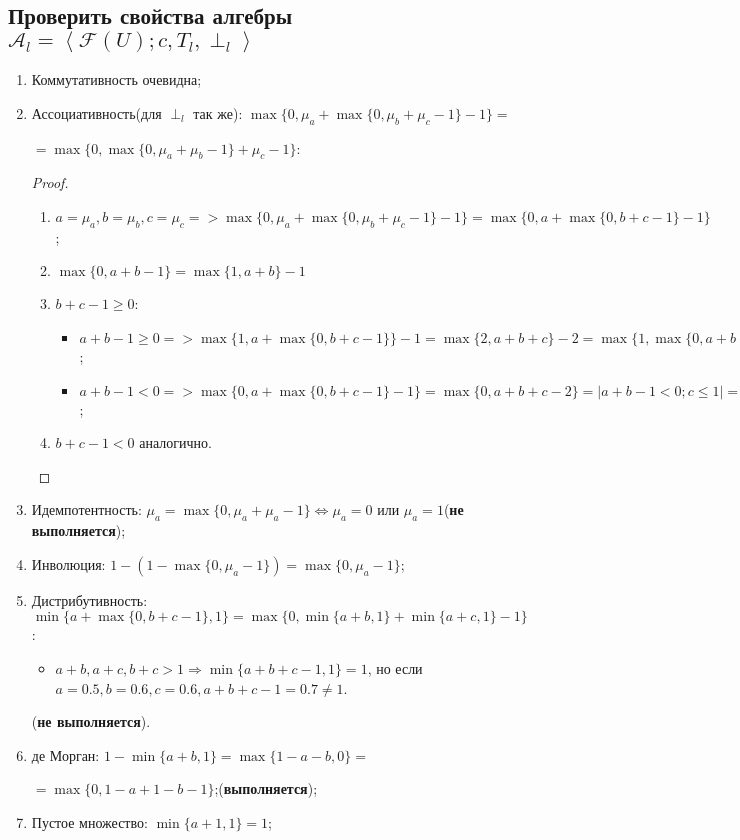 \documentclass[12pt]{article}
\begin{document}
\subsection{Проверить свойства алгебры $\mathcal{A}_l=\left<\mathcal{F}(U); c, T_l, \perp_l\right>$}

\begin{enumerate}
    \item Коммутативность очевидна;
    \item Ассоциативность(для $\perp_l$ так же): $\max\{0, \mu_a+\max\{0, \mu_b+\mu_c-1\}-1\} =$ 
    
    $= \max\{0, \max\{0, \mu_a+\mu_b-1\}+\mu_c-1\}$:
        \begin{proof}
            \begin{enumerate}
                \item $a = \mu_a, b=\mu_b, c=\mu_c => \max\{0, \mu_a+\max\{0, \mu_b+\mu_c-1\}-1\}=\max\{0, a+\max\{0, b+c-1\}-1\}$;
                \item $\max\{0, a+b-1\}=\max\{1, a+b\}-1$
                \item $b+c-1\ge0$:
                    \begin{itemize}
                        \item $a+b-1\ge0 => \max\{1, a+\max\{0, b+c-1\}\}-1=\max\{2, a+b+c\}-2=\max\{1, \max\{0, a+b-1\}+c\}-1$;
                        \item $a+b-1<0 =>  \max\{0, a+\max\{0, b+c-1\}-1\}=\max\{0, a+b+c-2\}=|a+b-1<0; c\le1|=0=\max\{0, c-1\}=\max\{0, \max\{0, a+b-1\}+c-1\}$;
                    \end{itemize}
                \item $b+c-1<0$ аналогично.
            \end{enumerate}
        \end{proof}
    \item Идемпотентность: $\mu_a=\max\{0, \mu_a+\mu_a-1\} \Leftrightarrow \mu_a = 0 \text{ или } \mu_a = 1$(\textbf{не выполняется});
    \item Инволюция: $1-(1-\max\{0, \mu_a-1\})=\max\{0, \mu_a-1\}$;
    \item Дистрибутивность: $\min\{a+\max\{0, b+c-1\}, 1\} = \max\{0, \min\{a+b, 1\}+\min\{a+c, 1\}-1\}$:
        \begin{itemize}
            \item $a+b, a+c, b+c > 1 \Rightarrow \min\{a+b+c-1, 1\}=1$, но если $a=0.5, b=0.6, c=0.6, a+b+c-1=0.7\neq1$.
        \end{itemize}
        (\textbf{не выполняется}).
    \item де Морган: $1-\min\{a+b, 1\}=\max\{1-a-b, 0\}=$
    
    $=\max\{0, 1-a+1-b-1\}$;(\textbf{выполняется});
    \item Пустое множество: $\min\{a+1, 1\}=1$;
\end{enumerate}
\end{document}
